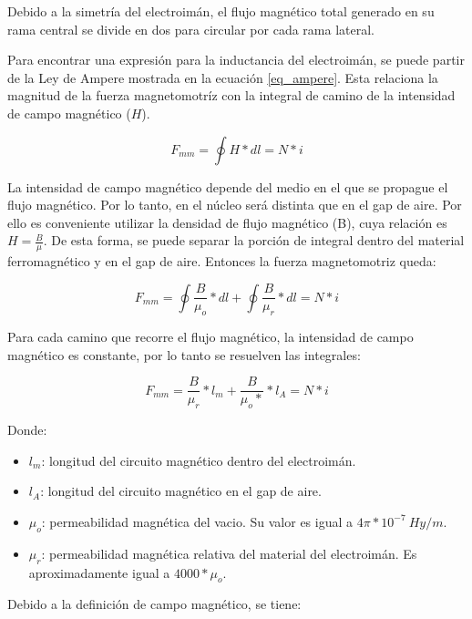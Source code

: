 \noindent Debido a la simetría del electroimán, el flujo magnético total generado en su rama central se divide en dos para circular por cada rama lateral.

\noindent Para encontrar una expresión para la inductancia del electroimán, se puede partir de la Ley de Ampere mostrada en la ecuación \ref{eq_ampere}. Esta relaciona la magnitud de la fuerza magnetomotríz con la integral de camino de la intensidad de campo magnético ($H$).

\begin{equation} \label{eq_ampere}
	F_{mm}=\oint{H*dl}=N*i
\end{equation}

\noindent La intensidad de campo magnético depende del medio en el que se propague el flujo magnético. Por lo tanto, en el núcleo será distinta que en el gap de aire. Por ello es conveniente utilizar la densidad de flujo magnético (B), cuya relación es $H=\frac{B}{\mu}$. De esta forma, se puede separar la porción de integral dentro del material ferromagnético y en el gap de aire. Entonces la fuerza magnetomotriz queda:

\begin{equation} 
	F_{mm}=\oint{\frac{B}{\mu_{o}}*dl}+\oint{\frac{B}{\mu_{r}}*dl}=N*i
\end{equation}

\noindent Para cada camino que recorre el flujo magnético, la intensidad de campo magnético es constante, por lo tanto se resuelven las integrales:

\begin{equation}
	F_{mm}=\frac{B}{\mu_{r}}*l_{m}+\frac{B}{\mu_{o}*}*l_{A}=N*i
\end{equation}

Donde:
\begin{itemize}
	\item $l_{m}$: longitud del circuito magnético dentro del electroimán.
	\item $l_{A}$: longitud del circuito magnético en el gap de aire.
	\item $\mu_{o}$: permeabilidad magnética del vacio. Su valor es igual a $4 \pi * 10^{-7}\:Hy/m$.
	\item $\mu_{r}$: permeabilidad magnética relativa del material del electroimán. Es aproximadamente igual a $4000 * \mu_{o}$.

\end{itemize}

\noindent Debido a la definición de campo magnético, se tiene:

